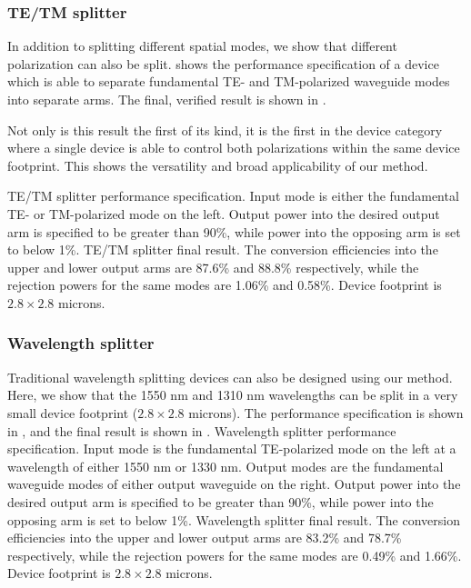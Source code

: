 \documentclass[letterpaper,10pt]{article}
\begin{document}
\subsubsection{TE/TM splitter}
In addition to splitting different spatial modes, 
    we show that different polarization can also be split.
 shows the performance specification of a 
    device which is able to separate fundamental TE- and TM-polarized
    waveguide modes into separate arms.
The final, verified result is shown in .

Not only is this result the first of its kind,
    it is the first in the device category where a single device
    is able to control both polarizations within the same device footprint.
This shows the versatility and broad applicability of our method.

    {TE/TM splitter performance specification.
    Input mode is either the fundamental TE- or TM-polarized 
        mode on the left.
    Output power into the desired output arm is specified to be greater than 90\%,
        while power into the opposing arm is set to below 1\%.}
    {TE/TM splitter final result.
    The conversion efficiencies into the upper and lower output arms
        are 87.6\% and 88.8\% respectively, 
        while the rejection powers for the same modes are 1.06\% and 0.58\%.
    Device footprint is $2.8\times2.8$ microns.}

\subsubsection{Wavelength splitter}
Traditional wavelength splitting devices can also be designed using our method.
Here, we show that the 1550 nm and 1310 nm wavelengths can be split
    in a very small device footprint ($2.8\times2.8$ microns).
The performance specification is shown in , 
    and the final result is shown in .
    {Wavelength splitter performance specification.
    Input mode is the fundamental TE-polarized mode on the left at 
        a wavelength of either 1550 nm or 1330 nm.
    Output modes are the fundamental waveguide modes of either output 
        waveguide on the right.
    Output power into the desired output arm is specified to be greater than 90\%,
        while power into the opposing arm is set to below 1\%.}
    {Wavelength splitter final result.
    The conversion efficiencies into the upper and lower output arms
        are 83.2\% and 78.7\% respectively, 
        while the rejection powers for the same modes are 0.49\% and 1.66\%.
    Device footprint is $2.8\times2.8$ microns.}
\end{document}
